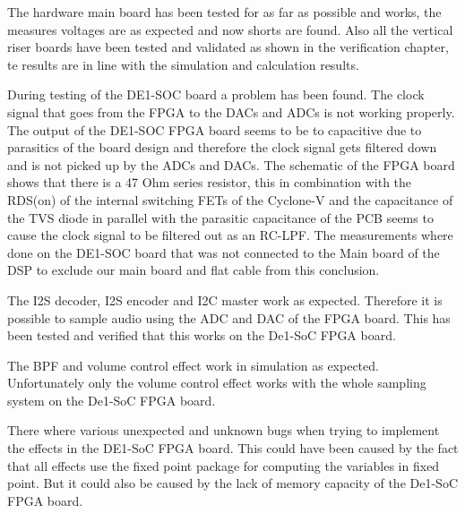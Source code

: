 

The hardware main board has been tested for as far as possible and works, the measures voltages are as expected and now shorts are found. Also all the vertical riser boards have been tested and validated as shown in the verification chapter, te results are in line with the simulation and calculation results.

During testing of the DE1-SOC board a problem has been found. The clock signal that goes from the FPGA to the DACs and ADCs is not working properly. The output of the DE1-SOC FPGA board seems to be to capacitive due to parasitics of the board design and therefore the clock signal gets filtered down and is not picked up by the ADCs and DACs. The schematic of the FPGA board shows that there is a 47 Ohm series resistor, this in combination with the RDS(on) of the internal switching FETs of the Cyclone-V and the capacitance of the TVS diode in parallel with the parasitic capacitance of the PCB seems to cause the clock signal to be filtered out as an RC-LPF. The measurements where done on the DE1-SOC board that was not connected to the Main board of the DSP to exclude our main board and flat cable from this conclusion.

The I2S decoder, I2S encoder and I2C master work as expected. Therefore it is possible to
sample audio using the ADC and DAC of the FPGA board. This has been tested and verified
that this works on the De1-SoC FPGA board. 

The BPF and volume control effect work in simulation as expected. Unfortunately only the
volume control effect works with the whole sampling system on the De1-SoC FPGA board.

There where various unexpected and unknown bugs when trying to implement the effects in
the DE1-SoC FPGA board. This could have been caused by the fact that all effects use the fixed
point package for computing the variables in fixed point. But it could also be caused by the lack
of memory capacity of the De1-SoC FPGA board. 

